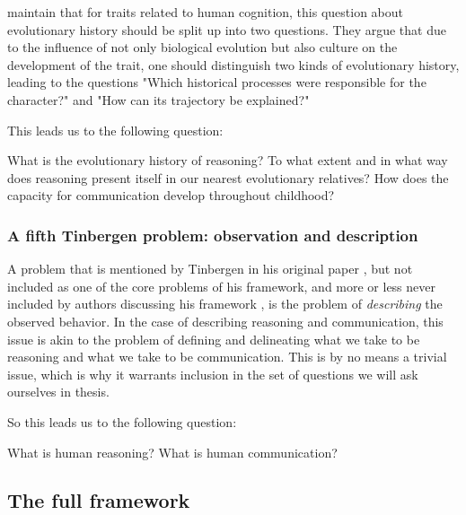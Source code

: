 \citet{BatesonLaland13} maintain that for traits related to human cognition, this question about evolutionary history should be split up into two questions. They argue that due to the influence of not only biological evolution but also culture on the development of the trait, one should distinguish two kinds of evolutionary history, leading to the questions "Which historical processes were responsible for the character?" and "How can its trajectory be explained?" \citep[p.~714]{BatesonLaland13}

This leads us to the following question:

\begin{exe}
    \ex
    \begin{xlist}
        \ex What is the evolutionary history of reasoning? To what extent and in what way does reasoning present itself in our nearest evolutionary relatives?
        \ex How does the capacity for communication develop throughout childhood?
    \end{xlist}
\end{exe}

\subsubsection{A fifth Tinbergen problem: observation and description}
A problem that is mentioned by Tinbergen in his original paper \citeyear{Tinbergen63}, but not included as one of the core problems of his framework, and more or less never included by authors discussing his framework \citep{LB02, Laland13, AllenBekoff95}, is the problem of \emph{describing} the observed behavior.
In the case of describing reasoning and communication, this issue is akin to the problem of defining and delineating what we take to be reasoning and what we take to be communication. This is by no means a trivial issue, which is why it warrants inclusion in the set of questions we will ask ourselves in thesis.

So this leads us to the following question:

\begin{exe}
    \ex
    \begin{xlist}
        \ex What is human reasoning?
        \ex What is human communication?
    \end{xlist}
\end{exe}

\subsection{The full framework}


